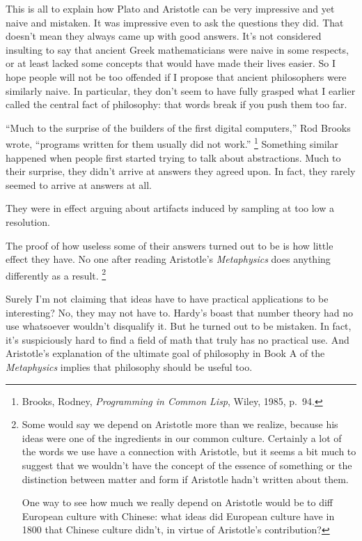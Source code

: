 This is all to explain how Plato and Aristotle can be very impressive
and yet naive and mistaken. It was impressive even to ask the questions
they did. That doesn't mean they always came up with good answers. It's
not considered insulting to say that ancient Greek mathematicians were
naive in some respects, or at least lacked some concepts that would have
made their lives easier. So I hope people will not be too offended if I
propose that ancient philosophers were similarly naive. In particular,
they don't seem to have fully grasped what I earlier called the central
fact of philosophy: that words break if you push them too far.

``Much to the surprise of the builders of the first digital computers,''
Rod Brooks wrote, ``programs written for them usually did not work.''
\footnote{Brooks, Rodney, \emph{Programming in Common Lisp}, Wiley, 1985,
p.~94.} Something similar happened when people first
started trying to talk about abstractions. Much to their surprise, they
didn't arrive at answers they agreed upon. In fact, they rarely seemed
to arrive at answers at all.

They were in effect arguing about artifacts induced by sampling at too
low a resolution.

The proof of how useless some of their answers turned out to be is how
little effect they have. No one after reading Aristotle's
\emph{Metaphysics} does anything differently as a result.
\footnote{Some would say we depend on Aristotle more than we realize,
because his ideas were one of the ingredients in our common culture.
Certainly a lot of the words we use have a connection with Aristotle,
but it seems a bit much to suggest that we wouldn't have the concept of
the essence of something or the distinction between matter and form if
Aristotle hadn't written about them.

One way to see how much we really depend on Aristotle would be to diff
European culture with Chinese: what ideas did European culture have in
1800 that Chinese culture didn't, in virtue of Aristotle's contribution?}

Surely I'm not claiming that ideas have to have practical applications
to be interesting? No, they may not have to. Hardy's boast that number
theory had no use whatsoever wouldn't disqualify it. But he turned out
to be mistaken. In fact, it's suspiciously hard to find a field of math
that truly has no practical use. And Aristotle's explanation of the
ultimate goal of philosophy in Book A of the \emph{Metaphysics} implies
that philosophy should be useful too.

